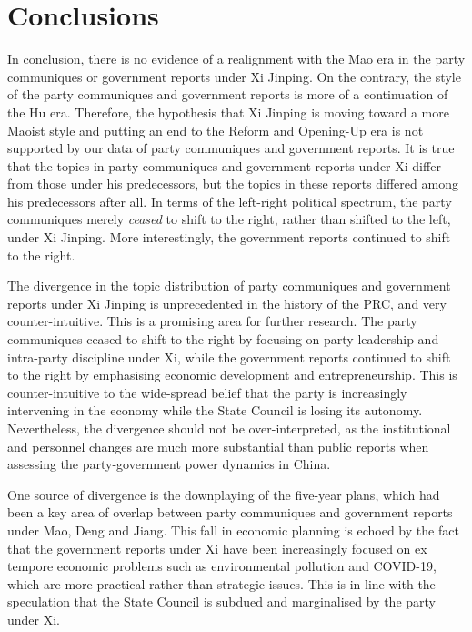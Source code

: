 \documentclass[
  letterpaper,
  abstract=true]{scrartcl}
\begin{document}
\section{Conclusions}\label{conclusions}

In conclusion, there is no evidence of a realignment with the Mao era in
the party communiques or government reports under Xi Jinping. On the
contrary, the style of the party communiques and government reports is
more of a continuation of the Hu era. Therefore, the hypothesis that Xi
Jinping is moving toward a more Maoist style and putting an end to the
Reform and Opening-Up era is not supported by our data of party
communiques and government reports. It is true that the topics in party
communiques and government reports under Xi differ from those under his
predecessors, but the topics in these reports differed among his
predecessors after all. In terms of the left-right political spectrum,
the party communiques merely \emph{ceased} to shift to the right, rather
than shifted to the left, under Xi Jinping. More interestingly, the
government reports continued to shift to the right.

The divergence in the topic distribution of party communiques and
government reports under Xi Jinping is unprecedented in the history of
the PRC, and very counter-intuitive. This is a promising area for
further research. The party communiques ceased to shift to the right by
focusing on party leadership and intra-party discipline under Xi, while
the government reports continued to shift to the right by emphasising
economic development and entrepreneurship. This is counter-intuitive to
the wide-spread belief that the party is increasingly intervening in the
economy while the State Council is losing its autonomy. Nevertheless,
the divergence should not be over-interpreted, as the institutional and
personnel changes are much more substantial than public reports when
assessing the party-government power dynamics in China.

One source of divergence is the downplaying of the five-year plans,
which had been a key area of overlap between party communiques and
government reports under Mao, Deng and Jiang. This fall in economic
planning is echoed by the fact that the government reports under Xi have
been increasingly focused on ex tempore economic problems such as
environmental pollution and COVID-19, which are more practical rather
than strategic issues. This is in line with the speculation that the
State Council is subdued and marginalised by the party under Xi.
\end{document}
